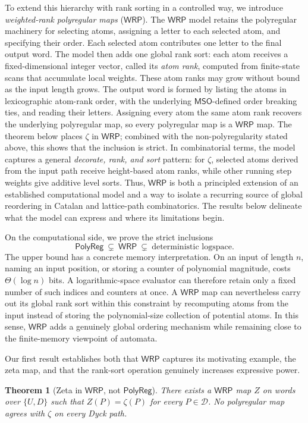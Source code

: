 \documentclass[11pt]{article}
\newtheorem{theorem}{Theorem}[section]
\theoremstyle{definition}
\newcommand{\D}{\mathcal D}
\newcommand{\WRP}{\mathsf{WRP}}
\newcommand{\MSO}{\mathsf{MSO}}
\newcommand{\polyreg}{\mathsf{PolyReg}}
\begin{document}
To extend this hierarchy with rank sorting in a controlled way, we introduce
\emph{weighted-rank polyregular maps} ($\WRP$).  The $\WRP$ model retains
the polyregular machinery for selecting atoms, assigning a letter to each
selected atom, and specifying their order.  Each selected atom contributes one
letter to the final output word.  The model then adds one global rank
sort: each atom receives a fixed-dimensional integer vector, called its
\emph{atom rank}, computed from
finite-state scans that accumulate local weights.  These atom ranks may grow
without bound as the input length grows.  The output word is formed by listing
the atoms in lexicographic atom-rank order, with the underlying $\MSO$-defined
order breaking ties, and reading their letters.  Assigning every atom the same
atom rank recovers the underlying
polyregular map, so every polyregular map is a $\WRP$ map.  The theorem below
places $\zeta$ in $\WRP$; combined with the non-polyregularity stated above,
this shows that the inclusion is strict.  In combinatorial terms, the model
captures a general \emph{decorate, rank, and sort} pattern: for $\zeta$, selected
atoms derived from the input path receive height-based atom ranks, while other
running step weights give additive level sorts.  Thus, $\WRP$ is both a
principled extension of an established computational model and a way to
isolate a recurring source of global reordering in Catalan and lattice-path
combinatorics.  The results below delineate what the model can express and
where its limitations begin.

On the computational side, we prove the strict inclusions
\[
   \polyreg\ \subsetneq\ \WRP
   \ \subsetneq\ \text{deterministic logspace}.
\]
The upper bound has a concrete memory interpretation.  On an input of length
$n$, naming an input position, or storing a counter of polynomial magnitude,
costs $\Theta(\log n)$ bits.  A logarithmic-space evaluator can therefore
retain only a fixed number of such indices and counters at once.  A $\WRP$ map
can nevertheless carry out its global rank sort within this constraint by
recomputing atoms from the input instead of storing the polynomial-size
collection of potential atoms.  In this sense, $\WRP$ adds a genuinely global
ordering mechanism while remaining close to the finite-memory viewpoint of
automata.

Our first result establishes both that $\WRP$ captures its motivating example,
the zeta map, and that the rank-sort operation genuinely increases expressive
power.
\begin{theorem}[Zeta in $\WRP$, not $\polyreg$]
\label{thm:intro-zeta-classification}
There exists a $\WRP$ map $Z$ on words over $\{U,D\}$ such that
$Z(P)=\zeta(P)$ for every $P\in\D$.
No polyregular map agrees with $\zeta$ on every Dyck path.
\end{theorem}
\end{document}
